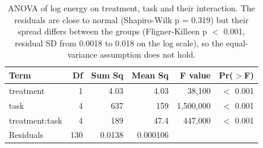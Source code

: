 \begin{table}[ht]
\centering
\caption{ANOVA of log energy on treatment, task and their interaction. The residuals are close to normal (Shapiro-Wilk p = 0.319) but their spread differs between the groups (Fligner-Killeen p $<$ 0.001, residual SD from 0.0018 to 0.018 on the log scale), so the equal-variance assumption does not hold.} 
\label{tab:07_lm_anova_log_energy}
\begingroup\small
\begin{tabular}{lrrrrr}
  \toprule
Term & Df & Sum Sq & Mean Sq & F value & Pr($>$F) \\ 
  \midrule
treatment & 1 & 4.03 & 4.03 & 38,100 & $<$ 0.001 \\ 
  task & 4 & 637 & 159 & 1,500,000 & $<$ 0.001 \\ 
  treatment:task & 4 & 189 & 47.4 & 447,000 & $<$ 0.001 \\ 
  Residuals & 130 & 0.0138 & 0.000106 &  &  \\ 
   \bottomrule
\end{tabular}
\endgroup
\end{table}

